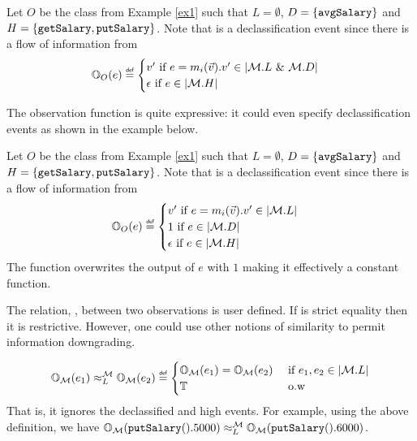 \documentclass[acmsmall,screen,review, nonacm]{acmart}
\begin{document}
\begin{example}
  Let $O$ be the class from Example \ref{ex1} such that  $L = \emptyset $, $D = \{ \mycode{avgSalary} \}$ and $H = \{\mycode{getSalary}, \mycode{putSalary} \}$.
  Note that  is a declassification event since there is a flow of information from 
  \[
  \ob{e}{O}{L} \isdef \begin{cases}
    v' \mbox{ if } e = m_i(\vec{v}).v' \in \abs{\classpart.L \directprod \classpart.D} \\
    \emptytr \mbox{ if } e \in \abs{\classpart.H}
  \end{cases}
  \]
\end{example}

The observation function is quite expressive: it could even specify declassification events as shown in the example below.

\begin{example}
  Let $O$ be the class from Example \ref{ex1} such that  $L = \emptyset $, $D = \{ \mycode{avgSalary} \}$ and $H = \{\mycode{getSalary}, \mycode{putSalary} \}$.
  Note that  is a declassification event since there is a flow of information from 
  \[
  \ob{e}{O}{L} \isdef \begin{cases}
    v' \mbox{ if } e = m_i(\vec{v}).v' \in \abs{\classpart.L} \\
    1 \mbox{ if } e \in \abs{\classpart.D} \\
    \emptytr \mbox{ if } e \in \abs{\classpart.H}
  \end{cases}
  \]
  The function overwrites the output of $e$ with $1$ making it effectively a constant function.
\end{example}

The relation, \obsim{\ell}{\classpart}, between two observations is user defined. If \obsim{\ell}{\classpart} is strict equality then it is  restrictive. However, one could use other notions of similarity to permit information downgrading.

\begin{example}
  \[
  \ob{e_1}{\classpart}{L} \obsim{L}{\classpart} \ob{e_2}{\classpart}{L} \isdef \begin{cases}
    \ob{e_1}{\classpart}{L} = \ob{e_2}{\classpart}{L} &\mbox{ if } e_1, e_2 \in \abs{\classpart.L} \\
    \true &\mbox{ o.w }
  \end{cases}
  \]
  That is, it ignores the declassified and high events. For example, using the above definition, we have $\ob{\mycode{putSalary}().5000}{\classpart}{L} \obsim{L}{\classpart} \ob{\mycode{putSalary}().6000}{\classpart}{L}$.
\end{example}
\end{document}
